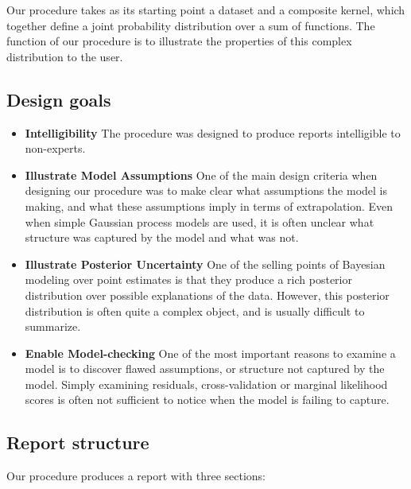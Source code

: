 \documentclass{article} %
\begin{document}
Our procedure takes as its starting point a dataset and a composite kernel, which together define a joint probability distribution over a sum of functions.  The function of our procedure is to illustrate the properties of this complex distribution to the user.

\subsection{Design goals}

\begin{itemize}
\item {\bf Intelligibility}
The procedure was designed to produce reports intelligible to non-experts.  

\item {\bf Illustrate Model Assumptions}
One of the main design criteria when designing our procedure was to make clear what assumptions the model is making, and what these assumptions imply in terms of extrapolation.  Even when simple Gaussian process models are used, it is often unclear what structure was captured by the model and what was not.

\item {\bf Illustrate Posterior Uncertainty}
One of the selling points of Bayesian modeling over point estimates is that they produce a rich posterior distribution over possible explanations of the data.  However, this posterior distribution is often quite a complex object, and is usually difficult to summarize.

\item {\bf Enable Model-checking}
One of the most important reasons to examine a model is to discover flawed assumptions, or structure not captured by the model.  Simply examining residuals, cross-validation or marginal likelihood scores is often not sufficient to notice when the model is failing to capture.
\end{itemize}

\subsection{Report structure}

Our procedure produces a report with three sections:
\end{document}
